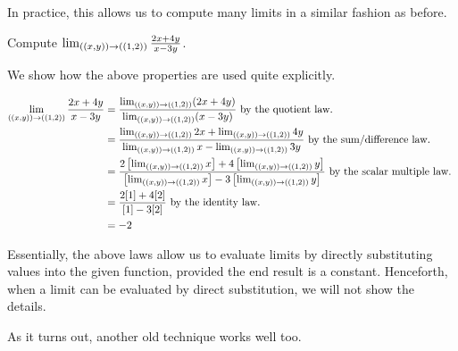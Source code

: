\documentclass{ximera}
\begin{document}
In practice, this allows us to compute many limits in a similar fashion as before.

\begin{example}
Compute $\lim_{\left(\left(x,y\right)\right) \to \left(\left(1,2\right)\right)} \frac{2x+4y}{x-3y}$.  

\begin{explanation}
We show how the above properties are used quite explicitly.

\begin{align*}
\lim_{\left(\left(x,y\right)\right) \to \left(\left(1,2\right)\right)} \frac{2x+4y}{x-3y} & = \frac{\lim_{\left(\left(x,y\right)\right) \to \left(\left(1,2\right)\right)}(2x+4y)}{\lim_{\left(\left(x,y\right)\right) \to \left(\left(1,2\right)\right)}(x-3y)} \textrm{ by the quotient law. } \\
&=  \frac{\lim_{\left(\left(x,y\right)\right) \to \left(\left(1,2\right)\right)}2x+\lim_{\left(\left(x,y\right)\right) \to \left(\left(1,2\right)\right)} 4y}{\lim_{\left(\left(x,y\right)\right) \to \left(\left(1,2\right)\right)}x-\lim_{\left(\left(x,y\right)\right) \to \left(\left(1,2\right)\right)}3y}  \textrm{ by the sum/difference law. } \\
&=  \frac{2\left[\lim_{\left(\left(x,y\right)\right) \to \left(\left(1,2\right)\right)}x\right]+4\left[\lim_{\left(\left(x,y\right)\right) \to \left(\left(1,2\right)\right)} y\right]}{\left[\lim_{\left(\left(x,y\right)\right) \to \left(\left(1,2\right)\right)}x\right]-3\left[\lim_{\left(\left(x,y\right)\right) \to \left(\left(1,2\right)\right)}y\right]}  \textrm{ by the scalar multiple law. } \\
&= \frac{2[1]+4[2]}{[1]-3[2]} \textrm{ by the identity law. } \\
&= -2
\end{align*}
\end{explanation}
\end{example}

Essentially, the above laws allow us to evaluate limits by directly substituting values into the given function, provided the end result is a constant.  Henceforth, when a limit can be evaluated by direct substitution, we will not show the details.  

As it turns out, another old technique works well too.

    
    
\end{document}
